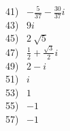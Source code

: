 \documentclass[12pt]{book}
\theoremstyle{definition}
\begin{document}
\begin{multicols}{4}
  41)~ $-\frac{5}{37}-\frac{30}{37}i$\\
  43)~ $9i$\\
  45)~ $2~\sqrt{5}$\\
  47)~ $\frac{1}{2}+\frac{\sqrt{3}}{2}i$\\
  49)~ $2-i$\\
  51)~ $i$\\
  53)~ $1$\\
  55)~ $-1$\\
  57)~ $-1$%

\end{multicols}
\end{document}
